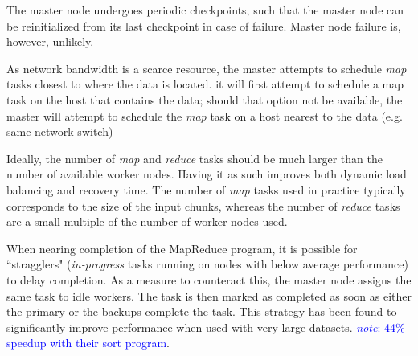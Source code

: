 \documentclass{report}
\newcommand{\note}[1]{\textcolor{blue}{\textit{note}: #1}}
\begin{document}
        The master node undergoes periodic checkpoints, such that the master
        node can be reinitialized from its last checkpoint in case of failure.
        Master node failure is, however, unlikely.

        As network bandwidth is a scarce resource, the master attempts to
        schedule \textit{map} tasks closest to where the data is located. it
        will first attempt to schedule a map task on the host that contains the
        data; should that option not be available, the master will attempt to
        schedule the \textit{map} task on a host nearest to the data (e.g. same
        network switch)

        Ideally, the number of \textit{map} and \textit{reduce} tasks should be
        much larger than the number of available worker nodes.  Having it as
        such improves both dynamic load balancing and recovery time. The number
        of \textit{map} tasks used in practice typically corresponds to the size
        of the input chunks, whereas the number of \textit{reduce} tasks are a
        small multiple of the number of worker nodes used.

        When nearing completion of the MapReduce program, it is possible for
        ``stragglers" (\textit{in-progress} tasks running on nodes with below
        average performance) to delay completion. As a measure to counteract
        this, the master node assigns the same task to idle workers. The task is
        then marked as completed as soon as either the primary or the backups
        complete the task. This strategy has been found to significantly improve
        performance when used with very large datasets.  \note{44\% speedup with
        their sort program}.
\end{document}
